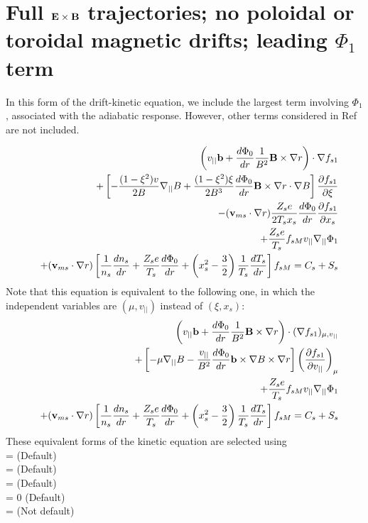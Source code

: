 \section{Full ${\mathbf E}\times{\mathbf B}$ trajectories; no poloidal or toroidal magnetic drifts; leading $\Phi_1$ term}

In this form of the drift-kinetic equation, we include the largest term involving $\Phi_1$,
associated with the adiabatic response.
However, other terms considered in Ref \cite{Regana2017} are not included.

\begin{eqnarray}
&&\left(v_{||}{\mathbf b} + \frac{d\Phi_0}{dr} \frac{1}{B^2} {\mathbf B}\times\nabla r \right) \cdot \nabla f_{s1} \\
&&+ \left[ - \frac{(1-\xi^2)v}{2B} \nabla_{||} B
+\frac{(1-\xi^2)\xi}{2B^3} \frac{d\Phi_0}{dr}{\mathbf B}\times\nabla r\cdot\nabla B \right]
 \frac{\partial f_{s1}}{\partial \xi} \nonumber \\
&&-({\mathbf v}_{ms} \cdot\nabla r) \frac{Z_s e}{2 T_s x_s} \frac{d\Phi_0}{dr} \frac{\partial f_{s1}}{\partial x_s} \nonumber \\
&&+\frac{Z_s e}{T_s} f_{sM} v_{||} \nabla_{||} \Phi_1 \nonumber \\
&&+ ({\mathbf v}_{ms} \cdot \nabla r) \left[ \frac{1}{n_s} \frac{dn_s}{dr} + \frac{Z_s e}{T_s} \frac{d\Phi_0}{dr} + \left(x_s^2-\frac{3}{2}\right) \frac{1}{T_s} \frac{dT_s}{dr}\right] f_{sM}
 = C_s + S_s \nonumber
\end{eqnarray}
Note that this equation is equivalent to the following one, in which the independent variables
are $(\mu,v_{||})$ instead of $(\xi,x_s)$:
\begin{eqnarray}
&&\left(v_{||}{\mathbf b} + \frac{d\Phi_0}{dr} \frac{1}{B^2} {\mathbf B}\times\nabla r \right) \cdot (\nabla f_{s1})_{\mu, v_{||}} \\
&&+ \left[ - \mu \nabla_{||} B
-\frac{v_{||}}{B^2} \frac{d\Phi_0}{dr} {\mathbf b}\times\nabla B \times \nabla r \right]
\left( \frac{\partial f_{s1}}{\partial v_{||}} \right)_{\mu} \nonumber \\
&&+\frac{Z_s e}{T_s} f_{sM} v_{||} \nabla_{||} \Phi_1 \nonumber \\
&& + ({\mathbf v}_{ms} \cdot \nabla r) \left[ \frac{1}{n_s} \frac{dn_s}{dr} + \frac{Z_s e}{T_s} \frac{d\Phi_0}{dr} + \left(x_s^2-\frac{3}{2}\right) \frac{1}{T_s} \frac{dT_s}{dr}\right] f_{sM}
=C_s + S_s \nonumber
\end{eqnarray}
These equivalent forms of the kinetic equation are selected using \\
 = \true  \;\;\; (Default) \\
 = \true \;\;\; (Default) \\
 = \false \;\;\; (Default) \\
 = 0 \;\;\; (Default) \\
 = \true \;\;\; (Not default) %



